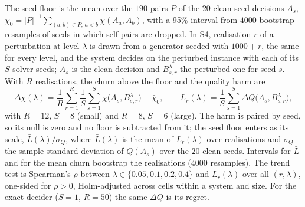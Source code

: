 The seed floor is the mean over the $190$ pairs $P$ of the $20$ clean seed decisions $A_s$,
$\bar\chi_0=|P|^{-1}\sum_{(a,b)\in P,\,a<b}\chi(A_a,A_b)$, with a 95\% interval from $4000$
bootstrap resamples of seeds in which self-pairs are dropped. In S4, realisation $r$ of a
perturbation at level $\lambda$ is drawn from a generator seeded with $1000+r$, the same for
every level, and the system decides on the perturbed instance with each of its $S$ solver
seeds; $A_s$ is the clean decision and $B_{s,r}^\lambda$ the perturbed one for seed $s$. With
$R$ realisations, the churn above the floor and the quality harm are
\begin{equation}\label{eq:above-floor}
\Delta\chi(\lambda)=\frac1R\sum_{r=1}^{R}\frac1S\sum_{s=1}^{S}\chi\bigl(A_s,B_{s,r}^{\lambda}\bigr)-\bar\chi_0,
\qquad
L_r(\lambda)=\frac1S\sum_{s=1}^{S}\Delta Q\bigl(A_s,B_{s,r}^{\lambda}\bigr),
\end{equation}
with $R=12$, $S=8$ (small) and $R=8$, $S=6$ (large). The harm is paired by seed, so its null
is zero and no floor is subtracted from it; the seed floor enters as its scale,
$\bar L(\lambda)/\sigma_Q$, where $\bar L(\lambda)$ is the mean of $L_r(\lambda)$ over
realisations and $\sigma_Q$ the sample standard deviation of $Q(A_s)$ over the $20$ clean seeds.
Intervals for $\bar L$ and for the mean churn bootstrap the realisations ($4000$ resamples).
The trend test is Spearman's $\rho$ between $\lambda\in\{0.05,0.1,0.2,0.4\}$ and $L_r(\lambda)$
over all $(r,\lambda)$, one-sided for $\rho>0$, Holm-adjusted across cells within a system
and size. For the exact decider ($S=1$, $R=50$) the same $\Delta Q$ is its regret.


